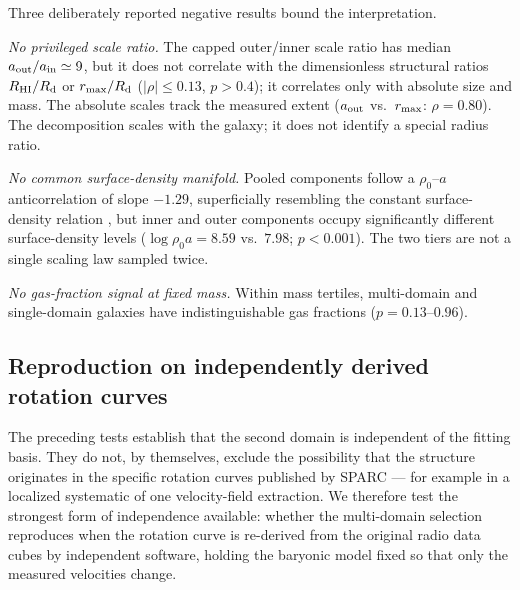 \documentclass[twocolumn]{aastex701}
\begin{document}
Three deliberately reported negative results bound the interpretation.

\emph{No privileged scale ratio.} The capped outer/inner scale ratio has
median $a_{\rm out}/a_{\rm in} \simeq 9$, but it does not correlate with the
dimensionless structural ratios $R_{\rm HI}/R_{\rm d}$ or
$r_{\rm max}/R_{\rm d}$ ($|\rho| \le 0.13$, $p > 0.4$); it correlates only
with absolute size and mass. The absolute scales track the measured extent
($a_{\rm out}$ vs.\ $r_{\rm max}$: $\rho = 0.80$). The decomposition scales
with the galaxy; it does not identify a special radius ratio.

\emph{No common surface-density manifold.} Pooled components follow a
$\rho_0$--$a$ anticorrelation of slope $-1.29$, superficially resembling the
constant surface-density relation \citep{Donato2009}, but inner and outer
components occupy significantly different surface-density levels
($\log \rho_0 a = 8.59$ vs.\ $7.98$; $p < 0.001$). The two tiers are not a
single scaling law sampled twice.

\emph{No gas-fraction signal at fixed mass.} Within mass tertiles,
multi-domain and single-domain galaxies have indistinguishable gas fractions
($p = 0.13$--$0.96$).

\subsection{Reproduction on independently derived rotation curves} \label{sec:dataindep}

The preceding tests establish that the second domain is independent of the
fitting basis. They do not, by themselves, exclude the possibility that the
structure originates in the specific rotation curves published by SPARC --- for
example in a localized systematic of one velocity-field extraction. We therefore
test the strongest form of independence available: whether the multi-domain
selection reproduces when the rotation curve is re-derived from the original
radio data cubes by independent software, holding the baryonic model fixed so
that only the measured velocities change.
\end{document}
